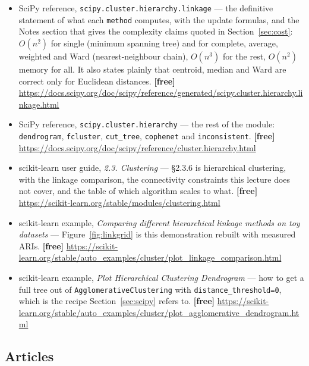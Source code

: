 \documentclass[11pt]{article}
\begin{document}
\begin{itemize}[leftmargin=*]
  \item SciPy reference, \texttt{scipy.cluster.hierarchy.linkage} --- the
    definitive statement of what each \texttt{method} computes, with the
    update formulas, and the Notes section that gives the complexity claims
    quoted in Section~\ref{sec:cost}: $O(n^2)$ for single (minimum spanning
    tree) and for complete, average, weighted and Ward
    (nearest-neighbour chain), $O(n^3)$ for the rest, $O(n^2)$ memory for all.
    It also states plainly that centroid, median and Ward are correct only for
    Euclidean distances. \textbf{[free]}
    \url{https://docs.scipy.org/doc/scipy/reference/generated/scipy.cluster.hierarchy.linkage.html}
  \item SciPy reference, \texttt{scipy.cluster.hierarchy} --- the rest of the
    module: \texttt{dendrogram}, \texttt{fcluster}, \texttt{cut\_tree},
    \texttt{cophenet} and \texttt{inconsistent}. \textbf{[free]}
    \url{https://docs.scipy.org/doc/scipy/reference/cluster.hierarchy.html}
  \item scikit-learn user guide, \emph{2.3. Clustering} --- \S2.3.6 is
    hierarchical clustering, with the linkage comparison, the connectivity
    constraints this lecture does not cover, and the table of which algorithm
    scales to what. \textbf{[free]}
    \url{https://scikit-learn.org/stable/modules/clustering.html}
  \item scikit-learn example, \emph{Comparing different hierarchical linkage
    methods on toy datasets} --- Figure~\ref{fig:linkgrid} is this
    demonstration rebuilt with measured ARIs. \textbf{[free]}
    \url{https://scikit-learn.org/stable/auto_examples/cluster/plot_linkage_comparison.html}
  \item scikit-learn example, \emph{Plot Hierarchical Clustering Dendrogram}
    --- how to get a full tree out of \texttt{AgglomerativeClustering} with
    \texttt{distance\_threshold=0}, which is the recipe
    Section~\ref{sec:scipy} refers to. \textbf{[free]}
    \url{https://scikit-learn.org/stable/auto_examples/cluster/plot_agglomerative_dendrogram.html}
\end{itemize}

\subsection*{Articles}
\end{document}
